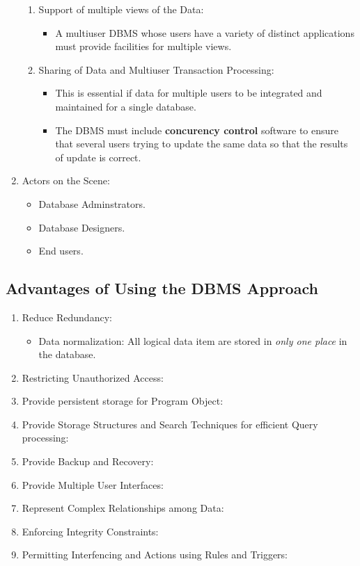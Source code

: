 \documentclass[10pt]{article}
\begin{document}
\begin{enumerate}
\begin{enumerate}
		\item Support of multiple views of the Data: 
		\begin{itemize}
			\item A multiuser DBMS whose users have a variety of distinct applications must provide facilities for multiple views.
		\end{itemize}

		\item Sharing of Data and Multiuser Transaction Processing: 
		\begin{itemize}
			\item This is essential if data for multiple users to be integrated and maintained for a single database.
			\item The DBMS must include \textbf{concurency control} software to ensure that several users trying to update the same data so that the results of update is correct.
		\end{itemize} 
	\end{enumerate}

	\item Actors on the Scene:
	\begin{itemize}
		\item Database Adminstrators.
		\item Database Designers.
		\item End users.
	\end{itemize}
\end{enumerate}

\subsection{Advantages of Using the DBMS Approach}
\begin{enumerate}
	\item Reduce Redundancy:
	\begin{itemize}
		\item Data normalization: All logical data item are stored in \textit{only one place} in the database.
	\end{itemize} 

	\item Restricting Unauthorized Access:
	\item Provide persistent storage for Program Object:
	\item Provide Storage Structures and Search Techniques for efficient Query processing:
	\item Provide Backup and Recovery:
	\item Provide Multiple User Interfaces:
	\item Represent Complex Relationships among Data:
	\item Enforcing Integrity Constraints:
	\item Permitting Interfencing and Actions using Rules and Triggers:
\end{enumerate}
\end{document}
